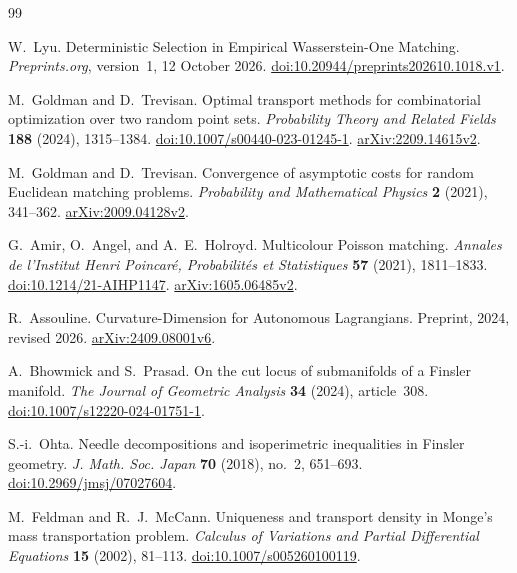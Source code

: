 \documentclass[11pt,reqno]{amsart}
\theoremstyle{definition}
\theoremstyle{remark}
\numberwithin{equation}{section}
\begin{document}
\begin{thebibliography}{99}

W.~Lyu.
Deterministic Selection in Empirical Wasserstein-One Matching.
\emph{Preprints.org}, version~1, 12 October 2026.
\href{https://doi.org/10.20944/preprints202610.1018.v1}{doi:10.20944/preprints202610.1018.v1}.

M.~Goldman and D.~Trevisan.
Optimal transport methods for combinatorial optimization over two random point sets.
\emph{Probability Theory and Related Fields} \textbf{188} (2024), 1315--1384.
\href{https://doi.org/10.1007/s00440-023-01245-1}{doi:10.1007/s00440-023-01245-1}.
\href{https://arxiv.org/abs/2209.14615v2}{arXiv:2209.14615v2}.

M.~Goldman and D.~Trevisan.
Convergence of asymptotic costs for random Euclidean matching problems.
\emph{Probability and Mathematical Physics} \textbf{2} (2021), 341--362.
\href{https://arxiv.org/abs/2009.04128v2}{arXiv:2009.04128v2}.

G.~Amir, O.~Angel, and A.~E.~Holroyd.
Multicolour Poisson matching.
\emph{Annales de l'Institut Henri Poincar\'e, Probabilit\'es et Statistiques}
\textbf{57} (2021), 1811--1833.
\href{https://doi.org/10.1214/21-AIHP1147}{doi:10.1214/21-AIHP1147}.
\href{https://arxiv.org/abs/1605.06485v2}{arXiv:1605.06485v2}.

R.~Assouline.
Curvature-Dimension for Autonomous Lagrangians.
Preprint, 2024, revised 2026.
\href{https://arxiv.org/abs/2409.08001v6}{arXiv:2409.08001v6}.


A.~Bhowmick and S.~Prasad.
On the cut locus of submanifolds of a Finsler manifold.
\emph{The Journal of Geometric Analysis} \textbf{34} (2024), article~308.
\href{https://doi.org/10.1007/s12220-024-01751-1}{doi:10.1007/s12220-024-01751-1}.

S.-i.~Ohta.
Needle decompositions and isoperimetric inequalities in Finsler geometry.
\emph{J. Math. Soc. Japan} \textbf{70} (2018), no.~2, 651--693.
\href{https://doi.org/10.2969/jmsj/07027604}{doi:10.2969/jmsj/07027604}.

M.~Feldman and R.~J.~McCann.
Uniqueness and transport density in Monge's mass transportation problem.
\emph{Calculus of Variations and Partial Differential Equations}
\textbf{15} (2002), 81--113.
\href{https://doi.org/10.1007/s005260100119}{doi:10.1007/s005260100119}.


\end{thebibliography}
\end{document}
